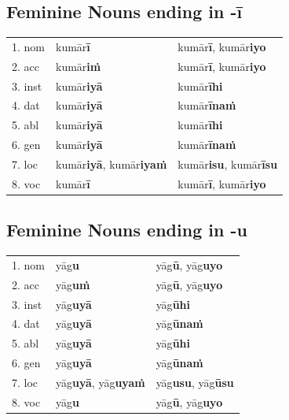 \documentclass[11pt,oneside]{memoir}
\begin{document}
\subsection{Feminine Nouns ending in -ī}
\label{sec:orgeaff138}

\begin{center}
\begin{tabular}{lll}
1. nom & kumār\textbf{ī} & kumār\textbf{ī}, kumār\textbf{iyo}\\[0pt]
2. acc & kumār\textbf{iṁ} & kumār\textbf{ī}, kumār\textbf{iyo}\\[0pt]
3. inst & kumār\textbf{iyā} & kumār\textbf{īhi}\\[0pt]
4. dat & kumār\textbf{iyā} & kumār\textbf{īnaṁ}\\[0pt]
5. abl & kumār\textbf{iyā} & kumār\textbf{īhi}\\[0pt]
6. gen & kumār\textbf{iyā} & kumār\textbf{īnaṁ}\\[0pt]
7. loc & kumār\textbf{iyā}, kumār\textbf{iyaṁ} & kumār\textbf{isu}, kumār\textbf{īsu}\\[0pt]
8. voc & kumār\textbf{ī} & kumār\textbf{ī}, kumār\textbf{iyo}\\[0pt]
\end{tabular}
\end{center}

\subsection{Feminine Nouns ending in -u}
\label{sec:orgeba307b}

\begin{center}
\begin{tabular}{lll}
1. nom & yāg\textbf{u} & yāg\textbf{ū}, yāg\textbf{uyo}\\[0pt]
2. acc & yāg\textbf{uṁ} & yāg\textbf{ū}, yāg\textbf{uyo}\\[0pt]
3. inst & yāg\textbf{uyā} & yāg\textbf{ūhi}\\[0pt]
4. dat & yāg\textbf{uyā} & yāg\textbf{ūnaṁ}\\[0pt]
5. abl & yāg\textbf{uyā} & yāg\textbf{ūhi}\\[0pt]
6. gen & yāg\textbf{uyā} & yāg\textbf{ūnaṁ}\\[0pt]
7. loc & yāg\textbf{uyā}, yāg\textbf{uyaṁ} & yāg\textbf{usu}, yāg\textbf{ūsu}\\[0pt]
8. voc & yāg\textbf{u} & yāg\textbf{ū}, yāg\textbf{uyo}\\[0pt]
\end{tabular}
\end{center}
\end{document}
